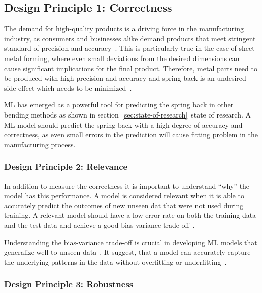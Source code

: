 \subsection*{Design Principle 1: Correctness}\label{correctness}

The demand for high-quality products is a driving force in the manufacturing industry,
as consumers and businesses alike demand products that meet stringent standard of
precision and accuracy~\cite[p. 1]{cruz_applicationmachinelearning_2021}.
This is particularly true in the case of sheet metal forming, where even small
deviations from the desired dimensions can cause significant implications for the final
product.
Therefore, metal parts need to be produced with high precision and accuracy and
spring back is an undesired side effect which needs to be
minimized~\cite[p.1]{cruz_applicationmachinelearning_2021}.

\ac{ML} has emerged as a powerful tool for predicting the spring back in other bending
methods as shown in section~\ref{sec:state-of-research}~state of research.
A \ac{ML} model should predict the spring back with a high degree of accuracy and
correctness, as even small errors in the prediction will cause fitting problem in the
manufacturing process.

\subsubsection*{Design Principle 2: Relevance}
In addition to measure the correctness it is important to understand ``why''
the model has this performance.
A model is considered relevant when it is able to accurately predict the outcomes of
new unseen dat that were not used during training.
A relevant model should have a low error rate on both the training data and the test
data and achieve a good bias-variance trade-off~\cite[p. 16]{siebert2022construction}.

Understanding the bias-variance trade-off is crucial in developing \ac{ML} models that
generalize well to unseen data~\cite[p. 49--51]{zhou_machinelearning_2021}.
It suggest, that a model can accurately capture the underlying patterns in the data
without overfitting or underfitting~\cite[p. 49--51]{zhou_machinelearning_2021}.

\subsubsection*{Design Principle 3: Robustness}

